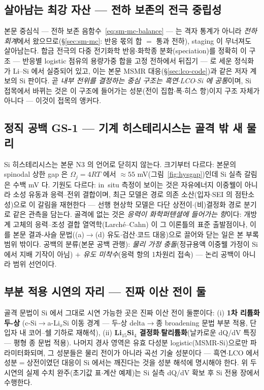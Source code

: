 \subsection{살아남는 최강 자산 --- 전하 보존의 전극 중립성}\label{ssec:si-anchor}
본문 중심식 --- 전하 보존 음함수~\eqref{eq:sm-mc-balance} --- 는 격자 통계가 아니라 \emph{전하
회계}에서 왔으므로(\S\ref{sec:sm-mc}: 반응 몫의 합 $=$ 통과 전하), staging 이 무너져도 살아남는다.
합금 전극의 다중 전기화학 반응$\cdot$화학종 분화(speciation)를 정확히 이 구조 --- 반응별 logistic
점유의 용량가중 합을 고정 전하에서 뒤집기 --- 로 세운 정식화가 Li--Si 에서
실증되어 있고\cite{verbrugge_lisi2016}, 이는 본문 MSMR 대응(\S\ref{sec:lco-code})과 같은 저자
계보의 Si 판이다. 곧 \emph{내부 전위를 결정하는 중심 구조는 흑연$\cdot$LCO$\cdot$Si 에 공통}이며,
Si 접목에서 바뀌는 것은 이 구조에 들어가는 성분(전이 집합$\cdot$폭$\cdot$히스 항)이지 구조 자체가
아니다 --- 이것이 접목의 앵커다.

\subsection{정직 공백 GS-1 --- 기계 히스테리시스는 골격 밖 새 물리}\label{ssec:si-gap}
Si 히스테리시스는 본문 N3 의 언어로 닫히지 않는다. 크기부터 다르다: 본문의 spinodal 상한
gap 은 $\Omega_j{=}4RT$ 에서 $\approx55$ mV(그림~\ref{fig:hysgap})인데 Si 실측 갈림은 수백 mV
다\cite{obrovac_chevrier2014}. 기원도 다르다: in~situ 측정이 보이는 것은 자유에너지 이중웰이 아니라
소성 유동과 응력--전위 결합이며\cite{sethuraman_stressevo2010,sethuraman_stresspot2010}, 최근 모델은
경로 의존 소산(입자$\cdot$SEI 의 점탄소성)으로 이 갈림을 재현한다\cite{koebbing2024} ---
선행 현상학 모델은 다단 상전이$\cdot$(비)결정화 경로 분기로 같은 관측을
담는다\cite{jiang_sihys2020}. 골격에 없는 것은 \emph{응력이 화학퍼텐셜에 들어가는 항}이다: 개방계
고체의 응력--조성 결합 열역학(Larché--Cahn)\cite{larchecahn1973} 이 그 이론틀의 표준 출발점이나, 이를
본문 결과-사슬 문법((a)$\to$(d) 유도$\cdot$검산$\cdot$코드 대응)으로 끌어와 닫는 일은 본 부록 범위
밖이다. 공백의 분류(본문 공백 관행): \emph{물리 가정 충돌}(정규용액 이중웰 가정이 Si 에서 지배
기작이 아님) $+$ \emph{유도 미착수}(응력 항의 1차원리 접속) --- 논리 공백이 아니라 범위 선언이다.

\subsection{부분 적용 시연의 자리 --- 진짜 이산 전이 둘}\label{ssec:si-partial}
골격 문법이 Si 에서 그대로 시연 가능한 곳은 진짜 이산 전이 둘뿐이다: (i) \textbf{1차 리튬화 두-상}
(c-Si$\to$a-Li$_x$Si 이동 경계 --- 두-상 delta$\to$종 broadening 문법 부분 적용, 단 입자 내
코어--쉘 기하로 재해석), (ii) \textbf{Li$_{15}$Si$_4$ 결정화$\cdot$탈리튬화}(날카로운 dQ/dV 특징 ---
평형 종 문법 적용). 나머지 경사 영역은 유효 다성분 logistic(MSMR-Si)으로만 파라미터화되며, 그
성분들은 물리 전이가 아니라 곡선 기술 성분이다 --- 흑연$\cdot$LCO 에서 성분$=$상전이였던 대응이 Si
에서는 깨진다는 것을 성분 해석에 명시해야 한다. 위 두 시연의 실제 수치 완주(초기값 표$\cdot$계산
예제)는 Si 실측 dQ/dV 확보 후 Si 전용 장에서 수행한다.


